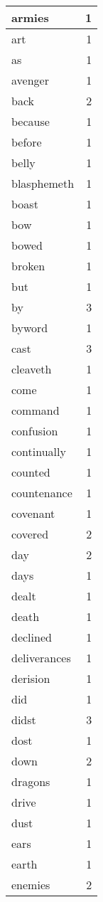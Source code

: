 \begin{center}
\begin{longtable}{l|r}
armies & 1 \\ \hline
art & 1 \\ \hline
as & 1 \\ \hline
avenger & 1 \\ \hline
back & 2 \\ \hline
because & 1 \\ \hline
before & 1 \\ \hline
belly & 1 \\ \hline
blasphemeth & 1 \\ \hline
boast & 1 \\ \hline
bow & 1 \\ \hline
bowed & 1 \\ \hline
broken & 1 \\ \hline
but & 1 \\ \hline
by & 3 \\ \hline
byword & 1 \\ \hline
cast & 3 \\ \hline
cleaveth & 1 \\ \hline
come & 1 \\ \hline
command & 1 \\ \hline
confusion & 1 \\ \hline
continually & 1 \\ \hline
counted & 1 \\ \hline
countenance & 1 \\ \hline
covenant & 1 \\ \hline
covered & 2 \\ \hline
day & 2 \\ \hline
days & 1 \\ \hline
dealt & 1 \\ \hline
death & 1 \\ \hline
declined & 1 \\ \hline
deliverances & 1 \\ \hline
derision & 1 \\ \hline
did & 1 \\ \hline
didst & 3 \\ \hline
dost & 1 \\ \hline
down & 2 \\ \hline
dragons & 1 \\ \hline
drive & 1 \\ \hline
dust & 1 \\ \hline
ears & 1 \\ \hline
earth & 1 \\ \hline
enemies & 2 \\ \hline

\end{longtable}
\end{center}
